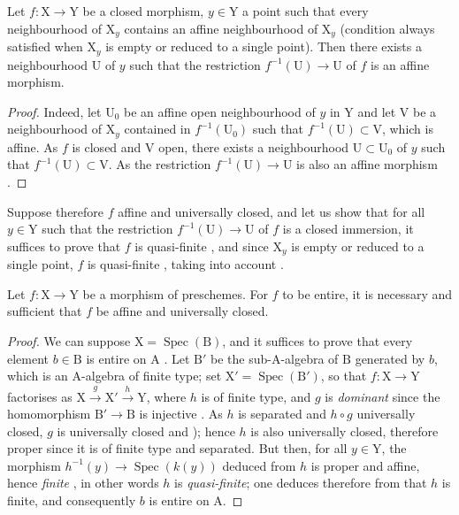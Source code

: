 \begin{lemma}[18.12.7.1]
\label{IV.18.12.7.1}
Let $f:\mathrm{X}\to\mathrm{Y}$ be a closed morphism, $y\in\mathrm{Y}$ a point such that every neighbourhood of $\mathrm{X}_y$ contains an affine neighbourhood of $\mathrm{X}_y$ (condition always satisfied when $\mathrm{X}_y$ is empty or reduced to a single point).
Then there exists a neighbourhood $\mathrm{U}$ of $y$ such that the restriction $f^{-1}(\mathrm{U})\to\mathrm{U}$ of $f$ is an affine morphism.
\end{lemma}

\begin{proof}
Indeed, let $\mathrm{U}_0$ be an affine open neighbourhood of $y$ in $\mathrm{Y}$ and let $\mathrm{V}$ be a neighbourhood of $\mathrm{X}_y$ contained in $f^{-1}(\mathrm{U}_0)$ such that $f^{-1}(\mathrm{U})\subset\mathrm{V}$, which is affine.
As $f$ is closed and $\mathrm{V}$ open, there exists a neighbourhood $\mathrm{U}\subset\mathrm{U}_0$ of $y$ such that $f^{-1}(\mathrm{U})\subset\mathrm{V}$.
As the restriction $f^{-1}(\mathrm{U})\to\mathrm{U}$ is also an affine morphism .
\end{proof}

Suppose therefore $f$ affine and universally closed, and let us show that for all $y\in\mathrm{Y}$ such that the restriction $f^{-1}(\mathrm{U})\to\mathrm{U}$ of $f$ is a closed immersion, it suffices to prove that $f$ is quasi-finite , and since $\mathrm{X}_y$ is empty or reduced to a single point, $f$ is quasi-finite , taking into account .

\begin{proposition}[18.12.8]
\label{IV.18.12.8}
Let $f:\mathrm{X}\to\mathrm{Y}$ be a morphism of preschemes.
For $f$ to be entire, it is necessary and sufficient that $f$ be affine and universally closed.
\end{proposition}

\begin{proof}
We can suppose $\mathrm{X}=\operatorname{Spec}(\mathrm{B})$, and it suffices to prove that every element $b\in\mathrm{B}$ is entire on $\mathrm{A}$ .
Let $\mathrm{B}'$ be the sub-$\mathrm{A}$-algebra of $\mathrm{B}$ generated by $b$, which is an $\mathrm{A}$-algebra of finite type; set $\mathrm{X}'=\operatorname{Spec}(\mathrm{B}')$, so that $f:\mathrm{X}\to\mathrm{Y}$ factorises as $\mathrm{X}\xrightarrow{g}\mathrm{X}'\xrightarrow{h}\mathrm{Y}$, where $h$ is of finite type, and $g$ is \emph{dominant} since the homomorphism $\mathrm{B}'\to\mathrm{B}$ is injective .
As $h$ is separated and $h\circ g$ universally closed, $g$ is universally closed  and
); hence $h$ is also universally closed, therefore proper since it is of finite type and separated.
But then, for all $y\in\mathrm{Y}$, the morphism $h^{-1}(y)\to\operatorname{Spec}(k(y))$ deduced from $h$ is proper and affine, hence \emph{finite} , in other words $h$ is \emph{quasi-finite}; one deduces therefore from  that $h$ is finite, and consequently $b$ is entire on $\mathrm{A}$.
\end{proof}

